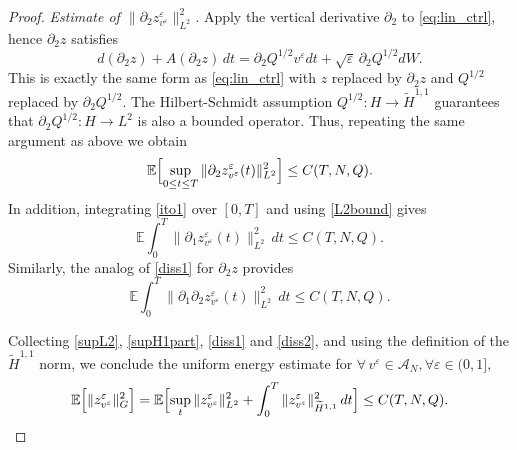 \documentclass[11pt,a4paper,reqno]{amsart}
\theoremstyle{definition}
\begin{document}
\begin{proof}
  \textit{Estimate of $\|\partial_2 z^\varepsilon_{v^\varepsilon}\|_{L^2}^2$.}
  Apply the vertical derivative $\partial_2$ to \eqref{eq:lin_ctrl},
 hence $\partial_2 z$ satisfies
  \[
    d(\partial_2 z) + A(\partial_2 z)\,dt
    = \partial_2 Q^{1/2} v^\varepsilon dt + \sqrt\varepsilon\, \partial_2 Q^{1/2} dW .
  \]
  This is exactly the same form as \eqref{eq:lin_ctrl} with $z$ replaced by $\partial_2 z$
  and $Q^{1/2}$ replaced by $\partial_2 Q^{1/2}$.  The Hilbert-Schmidt assumption
  $Q^{1/2}:H\to\widetilde H^{1,1}$ guarantees that $\partial_2 Q^{1/2}: H\to L^2$ is
  also a bounded operator.  Thus, repeating the same argument
  as above we obtain
  \begin{equation}\label{supH1part}
    \mathbb E\Bigl[ \sup_{0\le t\le T}\|\partial_2 z^\varepsilon_{v^\varepsilon}(t)\|_{L^2}^2 \Bigr]
    \le C(T,N,Q) .
  \end{equation}
  In addition, integrating \eqref{ito1} over $[0,T]$ and using \eqref{L2bound} gives
  \begin{equation}\label{diss1}
    \mathbb E\int_0^T \|\partial_1 z^\varepsilon_{v^\varepsilon}(t)\|_{L^2}^2\,dt
    \le C(T,N,Q) .
  \end{equation}
  Similarly, the analog of \eqref{diss1} for $\partial_2 z$ provides
  \begin{equation}\label{diss2}
    \mathbb E\int_0^T \|\partial_1\partial_2 z^\varepsilon_{v^\varepsilon}(t)\|_{L^2}^2\,dt
    \le C(T,N,Q) .
  \end{equation}

  Collecting \eqref{supL2}, \eqref{supH1part}, \eqref{diss1} and \eqref{diss2}, and using
  the definition of the $\widetilde H^{1,1}$ norm, we conclude the uniform energy estimate for $\forall\,v^\varepsilon\in\mathcal A_N ,  \forall \varepsilon\in(0,1],$
  \begin{equation}\label{energyG}
    \mathbb E\Bigl[ \|z^\varepsilon_{v^\varepsilon}\|_G^2 \Bigr]
    = \mathbb E\Bigl[ \sup_{t}\|z^\varepsilon_{v^\varepsilon}\|_{L^2}^2
               + \int_0^T \|z^\varepsilon_{v^\varepsilon}\|_{\widetilde H^{1,1}}^2\,dt \Bigr]
    \le C(T,N,Q) .
  \end{equation}


\end{proof}
\end{document}
